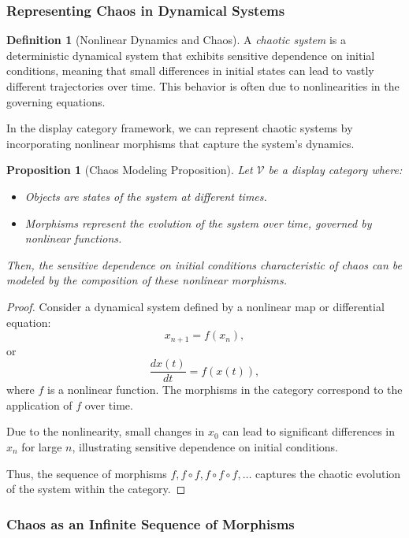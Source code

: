 \documentclass{article}
\newtheorem{proposition}{Proposition}[section]
\theoremstyle{definition}
\newtheorem{definition}{Definition}[section]
\theoremstyle{remark}
\begin{document}
	\subsubsection{Representing Chaos in Dynamical Systems}
	
	\begin{definition}[Nonlinear Dynamics and Chaos]
		A \emph{chaotic system} is a deterministic dynamical system that exhibits sensitive dependence on initial conditions, meaning that small differences in initial states can lead to vastly different trajectories over time. This behavior is often due to nonlinearities in the governing equations.
	\end{definition}
	
	In the display category framework, we can represent chaotic systems by incorporating nonlinear morphisms that capture the system's dynamics.
	
	\begin{proposition}[Chaos Modeling Proposition]
		Let $\mathcal{V}$ be a display category where:
		\begin{itemize}
			\item Objects are states of the system at different times.
			\item Morphisms represent the evolution of the system over time, governed by nonlinear functions.
		\end{itemize}
		Then, the sensitive dependence on initial conditions characteristic of chaos can be modeled by the composition of these nonlinear morphisms.
	\end{proposition}
	
	\begin{proof}
		Consider a dynamical system defined by a nonlinear map or differential equation:
		\[
		x_{n+1} = f(x_n),
		\]
		or
		\[
		\frac{dx(t)}{dt} = f(x(t)),
		\]
		where $f$ is a nonlinear function. The morphisms in the category correspond to the application of $f$ over time.
		
		Due to the nonlinearity, small changes in $x_0$ can lead to significant differences in $x_n$ for large $n$, illustrating sensitive dependence on initial conditions.
		
		Thus, the sequence of morphisms $f, f \circ f, f \circ f \circ f, \dots$ captures the chaotic evolution of the system within the category.
	\end{proof}
	
	
	\subsubsection{Chaos as an Infinite Sequence of Morphisms}
	
\end{document}
